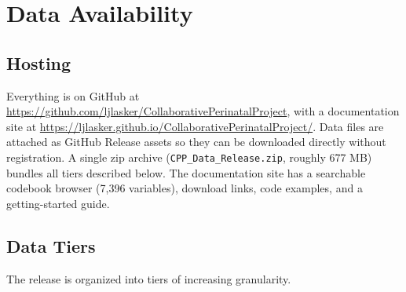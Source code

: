 \documentclass[12pt]{article}
\begin{document}
\section{Data Availability}

\subsection{Hosting}

Everything is on GitHub at \url{https://github.com/ljlasker/CollaborativePerinatalProject}, with a documentation site at \url{https://ljlasker.github.io/CollaborativePerinatalProject/}. Data files are attached as GitHub Release assets so they can be downloaded directly without registration. A single zip archive (\texttt{CPP\_Data\_Release.zip}, roughly 677 MB) bundles all tiers described below. The documentation site has a searchable codebook browser (7,396 variables), download links, code examples, and a getting-started guide.

\subsection{Data Tiers}

The release is organized into tiers of increasing granularity.
\end{document}
